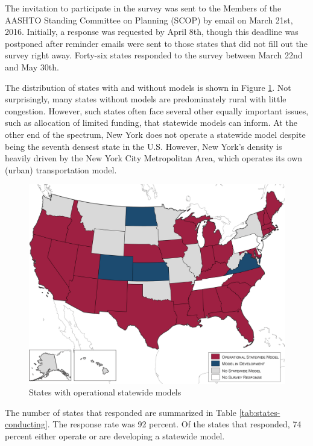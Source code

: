 The invitation to participate in the survey was sent to the Members of the AASHTO Standing Committee on Planning (SCOP) by email on March 21st, 2016. Initially, a response was requested by April 8th, though this deadline was postponed after reminder emails were sent to those states that did not fill out the survey right away. Forty-six states responded to the survey between March 22nd and May 30th.

The distribution of states with and without models is shown in Figure \ref{fig:states-with-operational-models}. Not surprisingly, many states without models are predominately rural with little congestion. However, such states often face several other equally important issues, such as allocation of limited funding, that statewide models can inform. At the other end of the spectrum, New York does not operate a statewide model despite being the seventh densest state in the U.S. However, New York's density is heavily driven by the New York City Metropolitan Area, which operates its own (urban) transportation model.

\begin{figure}[!t]
\centering
\includegraphics[width=6in]{graphics/01-states-with-operational-models}
\caption{States with operational statewide models}
\label{fig:states-with-operational-models}
\end{figure}

The number of states that responded are summarized in Table \ref{tab:states-conducting}. The response rate was 92 percent. Of the states that responded, 74 percent either operate or are developing a statewide model.

